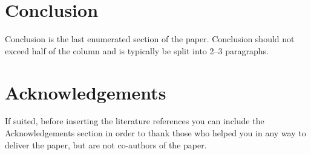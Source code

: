 \documentclass[10pt, a4paper]{article}
\begin{document}
\section{Conclusion}

Conclusion is the last enumerated section of the paper. Conclusion should not exceed half of the column and is typically be split into 2--3 paragraphs.

\section*{Acknowledgements}

If suited, before inserting the literature references you can include the Acknowledgements section in order to thank those who helped you in any way to deliver the paper, but are not co-authors of the paper.


 
\end{document}

